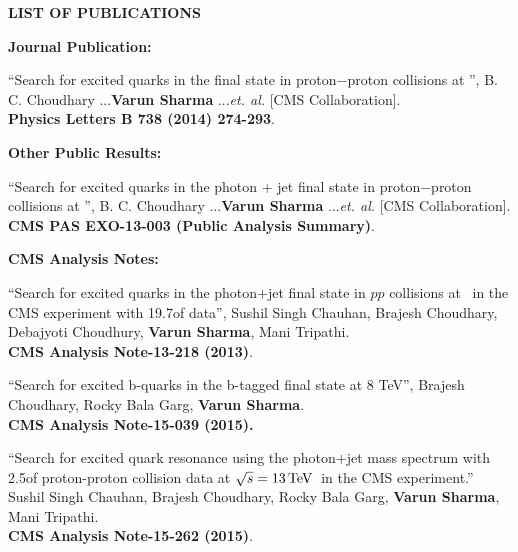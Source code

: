 \begin{center}
\doublespacing
{\Large \textbf{LIST OF PUBLICATIONS}}
\end{center}
{\Large \textbf{Journal Publication:}}
\begin{enumerate}
{%
\item ``Search for excited quarks in the \gamjet final state in proton$-$proton collisions at \sqrteighttev'', B. C. Choudhary ...{\bf Varun Sharma} ...\emph{et. al.} [CMS Collaboration]. \\ {\bf Physics Letters B 738 (2014) 274-293}.
}
\end{enumerate}
%
\vspace{0.3cm}
{\Large \textbf{Other Public Results:}}
\begin{enumerate}
{%
\item ``Search for excited quarks in the photon + jet final state in proton$-$proton collisions at \sqrteighttev'', B. C. Choudhary ...{\bf Varun Sharma} ...\emph{et. al.} [CMS Collaboration]. \\ {\bf CMS PAS EXO-13-003 (Public Analysis Summary)}.
}
\end{enumerate}
%
\vspace{0.3cm}
{\Large \textbf{CMS Analysis Notes:}}
\begin{enumerate}
{%
\item ``Search for excited quarks in the photon$+$jet final state in $pp$ collisions at \sqrteighttev$\,$ in the CMS experiment with 19.7\fbinv of data'', 
       Sushil Singh Chauhan, Brajesh Choudhary, Debajyoti Choudhury, {\bf Varun Sharma}, Mani Tripathi. \\
      {\bf CMS Analysis Note-13-218 (2013)}.

\item ``Search for excited b-quarks in the b-tagged \gamjet final state at 8 TeV'', Brajesh Choudhary, Rocky Bala Garg, {\bf Varun Sharma}. \\
       {\bf CMS Analysis Note-15-039 (2015).}      

\item ``Search for excited quark resonance using the photon$+$jet mass spectrum with 2.5\fbinv of proton-proton collision data at $ \sqrt{s}= 13\mathrm{\,TeV} \,$ in the CMS experiment.''
       Sushil Singh Chauhan, Brajesh Choudhary, Rocky Bala Garg, {\bf Varun Sharma}, Mani Tripathi. \\
      {\bf CMS Analysis Note-15-262 (2015)}.

}
\end{enumerate}
